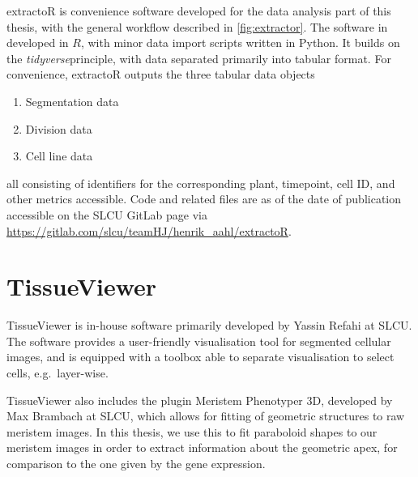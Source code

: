 extractoR is convenience software developed for the data analysis part of this
thesis, with the general workflow described in \cref{fig:extractor}. The
software in developed in $R$, with minor data import scripts written in Python.
It builds on the \textit{tidyverse}\CITE principle, with data separated
primarily into tabular format. For convenience, extractoR outputs the three
tabular data objects  
\begin{enumerate}
  \item Segmentation data
  \item Division data
  \item Cell line data
\end{enumerate}
all consisting of identifiers for the corresponding plant, timepoint, cell ID,
and other metrics accessible. Code and related files are as of the date of
publication accessible on the SLCU GitLab page via 
\url{https://gitlab.com/slcu/teamHJ/henrik_aahl/extractoR}.

\section{TissueViewer}
\label{sec:tissueviewer}
TissueViewer is in-house software primarily developed by Yassin Refahi at SLCU. The
software provides a user-friendly visualisation tool for segmented cellular
images, and is equipped with a toolbox able to separate visualisation to select
cells, e.g.\ layer-wise. 

TissueViewer also includes the plugin Meristem Phenotyper 3D, developed by Max
Brambach at SLCU, which allows for fitting of geometric structures to raw
meristem images. In this thesis, we use this to fit paraboloid shapes to our
meristem images in order to extract information about the geometric apex, for
comparison to the one given by the gene expression.
